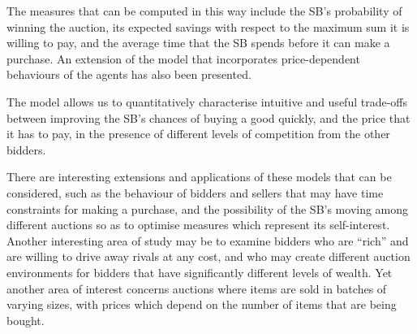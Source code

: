 \documentclass{article}
\begin{document}
The measures that can be computed in this way include the SB's
probability of winning the auction, its expected savings with
respect to the maximum sum it is willing to pay, and the average
time that the SB spends before it can make a purchase. An
extension of the model that incorporates price-dependent
behaviours of the agents has also been presented.

The model allows us to quantitatively characterise intuitive and
useful trade-offs between improving the SB's chances of buying a
good quickly, and the price that it has to pay, in the presence of
different levels of competition from the other bidders.


There are interesting extensions and applications of these models
that can be considered, such as the behaviour of bidders and
sellers that may have time constraints for making a purchase, and
the possibility of the SB's moving among different auctions so as
to optimise measures which represent its self-interest. Another
interesting area of study may be to examine bidders who are
``rich'' and are willing to drive away rivals at any cost, and who
may create different auction environments for bidders that have
significantly different levels of wealth. Yet another area of
interest concerns auctions where items are sold in batches of
varying sizes, with prices which depend on the number of items
that are being bought.



\nocite{*}
\end{document}
